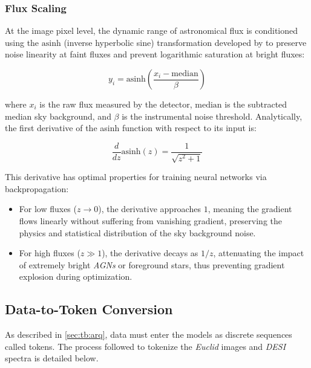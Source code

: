 \subsubsection{Flux Scaling}

At the image pixel level, the dynamic range of astronomical flux is conditioned using the $\text{asinh}$ (inverse hyperbolic sine) transformation developed by \textcite{ar:lupton-1999} to preserve noise linearity at faint fluxes and prevent logarithmic saturation at bright fluxes:

\begin{equation}
y_i = \text{asinh}\left(\dfrac{x_i - \text{median}}{\beta}\right)
\label{eq:asinh_transformation}
\end{equation}

where $x_i$ is the raw flux measured by the detector, $\text{median}$ is the subtracted median sky background, and $\beta$ is the instrumental noise threshold. Analytically, the first derivative of the asinh function with respect to its input is:

\begin{equation}
\dfrac{d}{dz} \text{asinh}\left(z\right) = \dfrac{1}{\sqrt{z^2 + 1}}
\label{eq:asinh_derivative}
\end{equation}

This derivative has optimal properties for training neural networks via backpropagation:

\begin{itemize}
\item For low fluxes ($z \to 0$), the derivative approaches $1$, meaning the gradient flows linearly without suffering from vanishing gradient, preserving the physics and statistical distribution of the sky background noise.
\item For high fluxes ($z \gg 1$), the derivative decays as $1/z$, attenuating the impact of extremely bright \textit{\glspl{AGN}} or foreground stars, thus preventing gradient explosion during optimization.
\end{itemize}

\subsection{Data-to-Token Conversion}

As described in \cref{sec:tb:arq}, data must enter the models as discrete sequences called tokens. The process followed to tokenize the \textit{Euclid} images and \textit{\gls{DESI}} spectra is detailed below.

